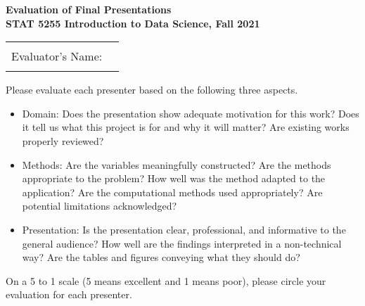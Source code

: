 \documentclass[12pt]{article}
\begin{document}

\begin{center}
  {\Large\bf Evaluation of Final Presentations\\[1ex]
    STAT 5255 Introduction to Data Science, Fall 2021}
\end{center}

\begin{center}
\begin{tabular}{|lr|}
\hline
& \\
{\Large Evaluator's Name:} \hfill & \phantom{xxxxxxxxxxxxxxxxxxxxxxxxxxxxxxxxxx} \\
& \\
\hline
\end{tabular}
\end{center}

\vspace{2cm}


Please evaluate each presenter based on the following three aspects.

\begin{itemize}
\item 
Domain:
Does the presentation show adequate motivation for this work? 
Does it tell us what this project is for and why it will matter?
Are existing works properly reviewed?

\item
Methods:
Are the variables meaningfully constructed?
Are the methods appropriate to the problem? 
How well was the method adapted to the application? 
Are the computational methods used appropriately?
Are potential limitations acknowledged?

\item
Presentation:
Is the presentation clear, professional, and informative
to the general audience?
How well are the findings interpreted in a non-technical way?
Are the tables and figures conveying what they should do?
\end{itemize}

\vspace{2cm}

On a 5 to 1 scale (5 means excellent and 1 means poor), please
circle your evaluation for each presenter.
\end{document}
